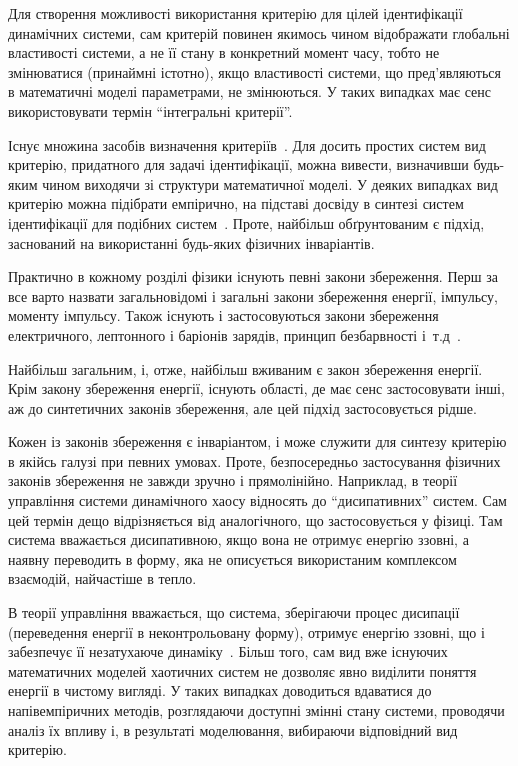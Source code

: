 Для створення можливості використання критерію для цілей ідентифікації
динамічних системи, сам критерій повинен якимось чином відображати глобальні
властивості системи, а не її стану в конкретний момент часу, тобто не
змінюватися (принаймні істотно), якщо властивості системи, що пред'являються в
математичні моделі параметрами, не змінюються. У таких випадках має сенс
використовувати термін ``інтегральні критерії''.

Існує множина засобів визначення
критеріїв~\cite{atu_asau11,atu_asau12,atu_asau14,atu_khar_autodor25,atu_asau18,atu_st79,atu_apir2013}.
Для досить простих систем вид критерію, придатного для задачі ідентифікації,
можна вивести, визначивши будь-яким чином виходячи зі структури математичної
моделі. У деяких випадках вид критерію можна підібрати емпірично, на
підставі досвіду в синтезі систем ідентифікації для подібних систем~\cite{atu_asau24}. Проте,
найбільш обґрунтованим є підхід, заснований на використанні будь-яких фізичних
інваріантів.



Практично в кожному розділі фізики існують певні закони
збереження. Перш за все варто назвати загальновідомі і загальні
закони збереження енергії, імпульсу, моменту імпульсу. Також
існують і застосовуються закони збереження електричного,
лептонного і баріонів зарядів, принцип безбарвності
і~т.д~\cite{vigner_invar}.

Найбільш загальним, і, отже, найбільш вживаним є закон збереження енергії.
Крім закону збереження енергії, існують області, де має сенс
застосовувати інші, аж до синтетичних законів збереження, але
цей підхід застосовується рідше.

Кожен із законів збереження є інваріантом, і може служити для
синтезу критерію в якійсь галузі при певних умовах. Проте,
безпосередньо застосування фізичних законів збереження не
завжди зручно і прямолінійно. Наприклад, в теорії управління
системи динамічного хаосу відносять до ``дисипативних''
систем. Сам цей термін дещо відрізняється від аналогічного, що
застосовується у фізиці. Там система вважається дисипативною,
якщо вона не отримує енергію ззовні,
а наявну переводить в форму, яка не
описується використаним комплексом взаємодій, найчастіше
в тепло.

В теорії управління вважається, що система, зберігаючи
процес дисипації (переведення енергії в неконтрольовану
форму), отримує енергію ззовні, що і забезпечує її незатухаюче
динаміку~\cite{prigogine_selforganization, chernavskii_syn_info, prigogine_order_from_chaos}. Більш
того, сам вид вже існуючих математичних моделей хаотичних систем
не дозволяє явно виділити поняття енергії в чистому вигляді. У
таких випадках доводиться вдаватися до напівемпіричних методів,
розглядаючи доступні змінні стану системи, проводячи аналіз
їх впливу і, в результаті моделювання, вибираючи відповідний
вид критерію.


